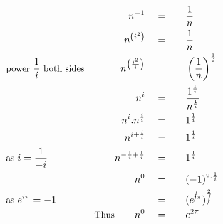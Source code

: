\begin{alignat*}{5}
&\,&n^{-1}\quad&=\quad&&\frac{1}{n}\\
&\,&n^{\left(i^2\right)}\quad&=&&\frac{1}{n}\\
&\small\text{power }\frac{1}{i}\text{ both sides}&n^{\left(\frac{i^2}{i}\right)}\quad&=&&\left(\frac{1}{n}\right)^\frac{1}{i}\\
&\,&n^i\quad&=&&\frac{1^\frac{1}{i}}{n^\frac{1}{i}}\\
&\,&n^i.n^\frac{i}{i}\quad&=&&1^\frac{1}{i}\\
&\,&n^{i+\frac{i}{i}}\quad&=&&1^\frac{1}{i}\\
&\small\text{as }i=\frac{1}{-i}&n^{-\frac{1}{i}+\frac{1}{i}}\quad&=&&1^\frac{1}{i}\\
&\,&n^0\quad&=&&(-1)^{2.\frac{1}{i}}\\
&\small\text{as }e^{i\pi}=-1&\,&=&&(e^{\cancel{i}\pi})^\frac{2}{\cancel{i}}\\
&\,&\small\text{Thus}\normalsize\qquad n^0\quad&=&&e^{2\pi}\\
\end{alignat*}
